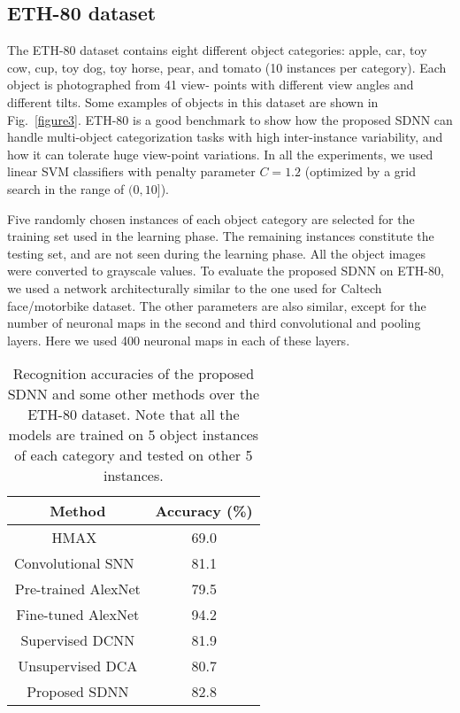 \documentclass[preprint,5p,12pt,twocolumn]{article}
\begin{document}
\subsection*{ETH-80 dataset}
The ETH-80 dataset contains eight different object categories: apple, car, toy cow, cup, toy dog, toy horse, pear, and tomato (10 instances per category). Each object is photographed from 41 view- points with different view angles and different tilts. Some examples of objects in this dataset are shown in Fig.~\ref{figure3}. ETH-80 is a good benchmark to show how the proposed SDNN can handle multi-object categorization tasks with high inter-instance variability, and how it can tolerate huge view-point variations. In all the experiments, we used linear SVM classifiers with penalty parameter $C=1.2$ (optimized by a grid search in the range of $(0,10]$). 



Five randomly chosen instances of each object category are selected for the training set  used in the learning phase. The remaining instances constitute the testing set, and are not seen during the learning phase. All the object images were converted to grayscale values. To evaluate the proposed SDNN on ETH-80, we used a network architecturally similar to the one used for Caltech face/motorbike dataset. The other parameters are also similar, except for the number of neuronal maps in the second and third convolutional and pooling layers. Here we used 400 neuronal maps in each of these layers.%

\begin{table}[!t]
\caption{Recognition accuracies of the proposed SDNN and some other methods over the ETH-80 dataset. Note that all the models are trained on 5 object instances of each category and tested on other 5 instances.}
\label{tab1}
\centering
\begin{tabular}{|c|c|}
\hline
Method & Accuracy (\%)\\ \hline
HMAX~\cite{kheradpisheh2016bio} & 69.0\\ \hline
Convolutional SNN~\cite{kheradpisheh2016bio} & 81.1\\ \hline
Pre-trained AlexNet &  79.5\\ \hline
Fine-tuned AlexNet &  94.2\\ \hline
Supervised DCNN &  81.9\\ \hline
Unsupervised DCA &  80.7\\ \hline
Proposed SDNN & 82.8\\
\hline
\end{tabular}
\end{table}
\end{document}
